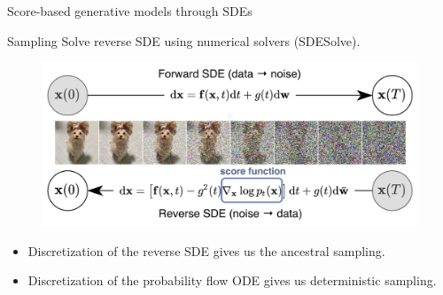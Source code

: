\begin{frame}{Score-based generative models through SDEs}
	\begin{block}{Sampling}
		Solve reverse SDE using numerical solvers (SDESolve).
		\begin{figure}
			\includegraphics[width=0.8\linewidth]{figs/sbgm}
		\end{figure}
		\vspace{-0.5cm}
	\end{block}
	\begin{itemize}
		\item Discretization of the reverse SDE gives us the ancestral sampling.
		\item Discretization of the probability flow ODE  gives us deterministic sampling.
	\end{itemize}
\end{frame}
